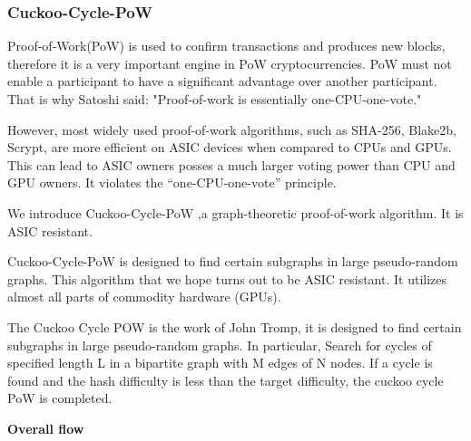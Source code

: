 \documentclass[a4paper,11pt]{article}
\begin{document}
\subsubsection{Cuckoo-Cycle-PoW}
Proof-of-Work(PoW) is used to confirm transactions and produces new blocks, therefore it is a very important engine in PoW cryptocurrencies. PoW must not enable a participant to have a significant advantage over another participant. That is why Satoshi said: "Proof-of-work is essentially one-CPU-one-vote."

However, most widely used proof-of-work algorithms, such as SHA-256, Blake2b, Scrypt, are more efficient on ASIC devices when compared to CPUs and GPUs. This can lead to ASIC owners posses a much larger voting power than CPU and GPU owners. It violates the “one-CPU-one-vote” principle.

We introduce Cuckoo-Cycle-PoW ,a graph-theoretic proof-of-work algorithm. It is ASIC resistant.

Cuckoo-Cycle-PoW is designed to find certain subgraphs in large pseudo-random graphs. This algorithm that we hope turns out to be ASIC resistant. It utilizes almost all parts of commodity hardware (GPUs).

The Cuckoo Cycle POW is the work of John Tromp, it is designed to find certain subgraphs in large pseudo-random graphs. In particular, Search for cycles of specified length L in a bipartite graph with M edges of N nodes. If a cycle is found and the hash difficulty is less than the target difficulty, the cuckoo cycle PoW is completed.


\textbf{Overall flow}
\end{document}
